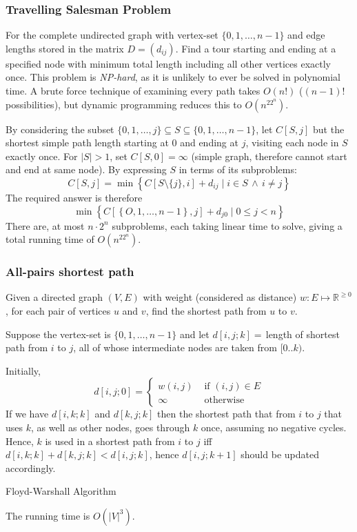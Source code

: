 \documentclass[10pt]{article}
\begin{document}
\subsubsection{Travelling Salesman Problem}
For the complete undirected graph with vertex-set $\{0,1,\ldots,n-1\}$ and edge lengths stored in the matrix $D=\left(d_{ij}\right)$.
Find a tour starting and ending at a specified node with minimum total length including all other vertices exactly once.
This problem is \emph{NP-hard}, as it is unlikely to ever be solved in polynomial time.  A brute force technique of examining every path takes $O(n!)$ ($(n-1)!$ possibilities), but dynamic programming reduces this to $O(n^22^n)$.

By considering the subset $\{0,1,\ldots,j\}\subseteq S\subseteq \{0,1,\ldots,n-1\}$, let $C[S,j]$ but the shortest simple path length starting at 0 and ending at $j$, visiting each node in $S$ exactly once.  For $|S|>1$, set $C[S,0]=\infty$ (simple graph, therefore cannot start and end at same node).  By expressing $S$ in terms of its subproblems: \[C[S,j]=\min\left\{C[S\setminus\{j\},i]+d_{ij}\mid i\in S\,\wedge\, i\neq j\right\}\]
The required answer is therefore \[\min\left\{C\left[\left\{O,1,\ldots,n-1\right\},j\right]+d_{j0}\mid 0\le j < n\right\}\]
There are, at most $n\cdot 2^n$ subproblems, each taking linear time to solve, giving a total running time of $O\left(n^22^n\right)$.
\subsubsection{All-pairs shortest path}
\label{sec:fw}
Given a directed graph $(V,E)$ with weight (considered as distance) $w:E\mapsto \mathbb{R}^{\ge0}$, for each pair of vertices $u$ and $v$, find the shortest path from $u$ to $v$.

Suppose the vertex-set is $\{0,1,\ldots,n-1\}$ and let $d[i,j;k]=\,$length of shortest path from $i$ to $j$, all of whose intermediate nodes are taken from $[0..k)$.

Initially, \[d[i,j;0]=\begin{cases}w(i,j)&\text{ if }(i,j)\in E\\\infty&\text{ otherwise}\end{cases}\]
If we have $d[i,k;k]$ and $d[k,j;k]$ then the shortest path that from $i$ to $j$ that uses $k$, as well as other nodes, goes through $k$ once, assuming no negative cycles.  Hence, $k$ is used in a shortest path from $i$ to $j$ iff $d[i,k;k]+d[k,j;k]<d[i,j;k]$, hence $d[i,j;k+1]$ should be updated accordingly.
\begin{algorithm}
\caption{Floyd-Warshall Algorithm}

\;
\end{algorithm}
The running time is $O\left(|V|^3\right)$.
\end{document}
